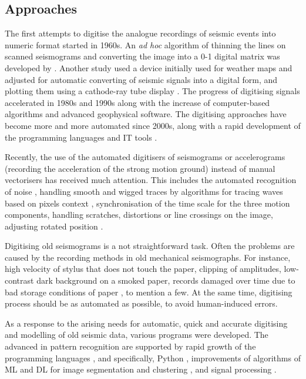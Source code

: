 \documentclass[informatics,article,submit,moreauthors,pdftex]{Definitions/mdpi}
\begin{document}
\subsection{Approaches}
The first attempts to digitise the analogue recordings of seismic events into numeric format started in 1960s. An \emph{ad hoc} algorithm of thinning the lines on scanned seismograms and converting the image into a 0-1 digital matrix was developed by \cite{Jarosch1975}. Another study used a device initially used for weather maps and adjusted for automatic converting of seismic signals into a digital form, and plotting them using a cathode-ray tube display \cite{AdamsAllen1961}. The progress of digitising signals accelerated in 1980s \citep{AspinallLatchman,CrouseMatuschka1983} and 1990s \citep{Scherbaum1996a,NorlundGriffiths1993,McGee1995,Harjesetal1993,Scherbaum1996b,Scherbaum1996c} along with the increase of computer-based algorithms and advanced geophysical software. The digitising approaches have become more and more automated since 2000s, along with a rapid development of the programming languages and IT tools \cite{Bietal2016,Ishiietal2015,Schenke,Wangetal2014}. 
 
Recently, the use of the automated digitisers of seismograms or accelerograms (recording the acceleration of the strong motion ground) instead of manual vectorisers has received much attention. This includes the automated recognition of noise \cite{CrouseMatuschka1983}, handling smooth and wigged traces by algorithms for tracing waves based on pixels context \cite{Bietal2016}, synchronisation of the time scale for the three motion components, handling scratches, distortions or line crossings on the image, adjusting rotated position \cite{Trifunacetal1999}. 

Digitising old seismograms is a not straightforward task. Often the problems are caused by the recording methods in old mechanical seismographs. For instance, high velocity of stylus that does not touch the paper, clipping of amplitudes, low-contrast dark background on a smoked paper, records damaged over time due to bad storage conditions of paper \cite{Baskoutasetal2000}, to mention a few. At the same time, digitising process should be as automated as possible, to avoid human-induced errors. 

As a response to the arising needs for automatic, quick and accurate digitising and modelling of old seismic data, various programs were developed. The advanced in pattern recognition are supported by rapid growth of the programming languages \cite{Esmaili,analytica2030006,Lemenkova201991,Lemenkova2019100,Lemenkov202103}, and specifically, Python \cite{Cox,Stoneback, Lemenkova201989}, improvements of algorithms of \ac{ML} and \ac{DL} for image segmentation and clustering \cite{Jenkins,signals1010005,DebeirDecaestecker,signals2030037,Debeir2008}, and signal processing \cite{Foucart,Debeiretal2019}. 
\end{document}
